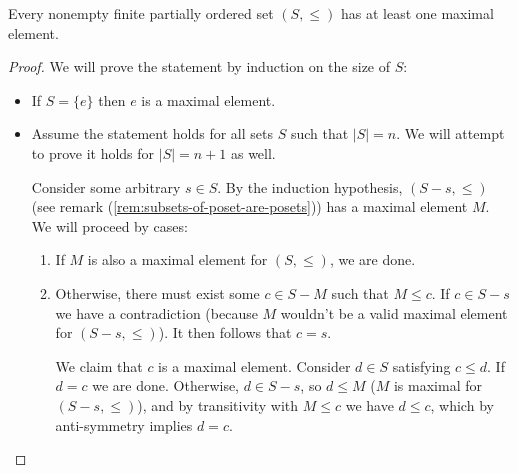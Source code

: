  \begin{lemma}\label{lem:nonempty-finite-posets-have-maximal-elements}
   Every nonempty finite partially ordered set $(S, \leq )$ has at least one maximal element. 
 \end{lemma}

 \begin{proof}
  We will prove the statement by induction on the size of $S$:
  \begin{itemize}
    \item If $S = \{e\}$ then $e$ is a maximal element.
    \item Assume the statement holds for all sets $S$ such that $|S| = n$. We will attempt to prove it holds for $|S| = n + 1$ as well. 

      Consider some arbitrary $s \in S$. By the induction hypothesis, $(S - s, \leq)$ (see remark (\ref{rem:subsets-of-poset-are-posets})) has a maximal element $M$. We will proceed by cases:
      \begin{enumerate}
        \item If $M$ is also a maximal element for $(S, \leq)$, we are done.
        \item Otherwise, there must exist some $c \in S - M$ such that $M \leq  c$. If $c \in S - s$ we have a contradiction (because $M$ wouldn't be a valid maximal element for $(S - s, \leq )$). It then follows that $c = s$. 

          We claim that $c$ is a maximal element. Consider $d \in S$ satisfying $c \leq d$. If $d = c$ we are done. Otherwise, $d \in S - s$, so $d \leq M$ ($M$ is maximal for $(S - s, \leq )$), and by transitivity with $M \leq c$ we have $d \leq c$, which by anti-symmetry implies $d = c$.
      \end{enumerate}
  \end{itemize}
 \end{proof}
